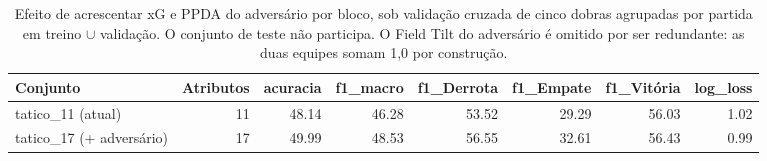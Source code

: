 \begin{table}[htbp]
\centering
\caption{Efeito de acrescentar xG e PPDA do adversário por bloco, sob validação cruzada de cinco dobras agrupadas por partida em treino $\cup$ validação. O conjunto de teste não participa. O Field Tilt do adversário é omitido por ser redundante: as duas equipes somam 1,0 por construção.}
\label{tab:diag-adversario}
\small
\begin{tabular}{lrrrrrrr}
\toprule
Conjunto & Atributos & acuracia & f1\_macro & f1\_Derrota & f1\_Empate & f1\_Vitória & log\_loss \\
\midrule
tatico\_11 (atual) & 11 & 48.14 & 46.28 & 53.52 & 29.29 & 56.03 & 1.02 \\
tatico\_17 (+ adversário) & 17 & 49.99 & 48.53 & 56.55 & 32.61 & 56.43 & 0.99 \\
\bottomrule
\end{tabular}
\end{table}
